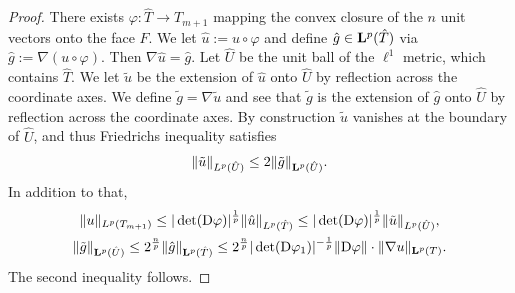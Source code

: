 \documentclass[a4paper]{article}
\begin{document}
\begin{proof}
    
    There exists $\varphi : \hat T \rightarrow T_{m+1}$ mapping the convex closure of the $n$ unit vectors onto the face $F$.
    We let $\hat u := u \circ \varphi$ and define $\hat g \in {\mathbf L}^p(\hat T)$ via $\hat g := \nabla ( u \circ \varphi )$. 
    Then $\nabla \hat u = \hat g$. 
    Let $\hat U$ be the unit ball of the $\ell^1$ metric, which contains $\hat T$.
    We let $\tilde u$ be the extension of $\hat u$ onto $\hat U$ by reflection across the coordinate axes.
    We define $\tilde g = \nabla \tilde u$
    and see that $\tilde g$ is the extension of $\hat g$ onto $\hat U$ by reflection across the coordinate axes. 
    By construction $\tilde u$ vanishes at the boundary of $\hat U$, and thus Friedrichs inequality satisfies 
    \begin{gather*}
        \| \tilde u \|_{L^{p}(\hat U)} 
        \leq 
        2 
        \| \tilde g \|_{{\mathbf L}^{p}(\hat U)}
        .
    \end{gather*}
    In addition to that, 
    \begin{gather*}
        \| u \|_{L^{p}(T_{m+1})}
        \leq 
        |\det({\mathrm D} \varphi)|^{\frac 1 p} 
        \| \hat u \|_{L^{p}(\hat T)}
        \leq 
        |\det({\mathrm D} \varphi)|^{\frac 1 p} 
        \| \tilde u \|_{L^{p}(\hat U)}
        ,
        \\
        \| \tilde g \|_{{\mathbf L}^{p}(\hat U)}
        \leq 
        2^{\frac n p}
        \| \hat g \|_{{\mathbf L}^{p}(\hat T)}
        \leq 
        2^{\frac n p}
        |\det({\mathrm D} \varphi_1)|^{-\frac 1 p} \| {\mathrm D} \varphi \| \cdot 
        \| \nabla u \|_{{\mathbf L}^{p}(T)}
        .
    \end{gather*}
    The second inequality follows.
\end{proof}
\end{document}
